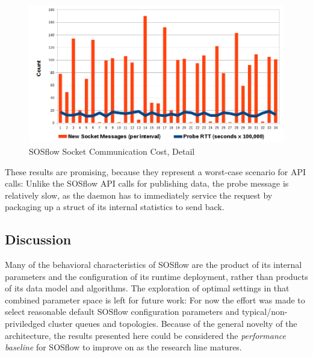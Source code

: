\begin{figure}[h]
\centering
\includegraphics[width=\columnwidth]{images/icebox_api_cost_zoom.png}
\caption{SOSflow Socket Communication Cost, Detail}
\label{sock_cost_detail}
\end{figure}
%
\par
%
These results are promising, because they represent a worst-case
scenario for API calls: Unlike the SOSflow API calls for publishing
data, the probe message is relatively slow, as the daemon has to
immediately service the request by packaging up a struct of its
internal statistics to send back.
%



\subsection{Discussion} %
%
Many of the behavioral characteristics of SOSflow are the product of
its internal parameters and the configuration of its runtime
deployment, rather than products of its data model and algorithms.
%
The exploration of optimal settings in that combined parameter space
is left for future work: For now the effort was made to select
reasonable default SOSflow configuration parameters and
typical/non-priviledged cluster queues and topologies.
%
Because of the general novelty of the architecture, the results
presented here could be considered the \textit{performance baseline}
for SOSflow to improve on as the research line matures.




